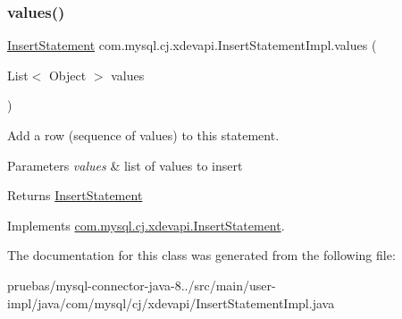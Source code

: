 \subsubsection{\texorpdfstring{values()}{values()}}
{\footnotesize\ttfamily \mbox{\hyperlink{interfacecom_1_1mysql_1_1cj_1_1xdevapi_1_1_insert_statement}{Insert\+Statement}} com.\+mysql.\+cj.\+xdevapi.\+Insert\+Statement\+Impl.\+values (\begin{DoxyParamCaption}\item[{List$<$ Object $>$}]{values }\end{DoxyParamCaption})}

Add a row (sequence of values) to this statement.


\begin{DoxyParams}{Parameters}
{\em values} & list of values to insert \\
\hline
\end{DoxyParams}
\begin{DoxyReturn}{Returns}
\mbox{\hyperlink{interfacecom_1_1mysql_1_1cj_1_1xdevapi_1_1_insert_statement}{Insert\+Statement}} 
\end{DoxyReturn}


Implements \mbox{\hyperlink{interfacecom_1_1mysql_1_1cj_1_1xdevapi_1_1_insert_statement_a9e215690da535d030277c17766cdbfbe}{com.\+mysql.\+cj.\+xdevapi.\+Insert\+Statement}}.



The documentation for this class was generated from the following file\+:\begin{DoxyCompactItemize}
\item 
pruebas/mysql-\/connector-\/java-\/8../src/main/user-\/impl/java/com/mysql/cj/xdevapi/Insert\+Statement\+Impl.\+java\end{DoxyCompactItemize}

